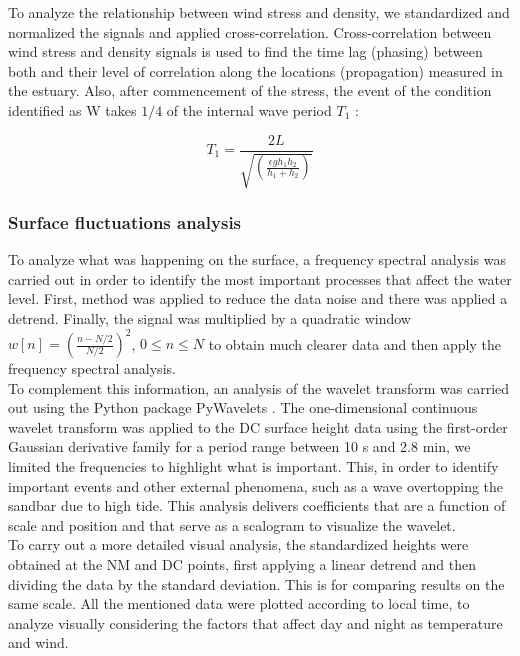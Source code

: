 \documentclass[tesis.tex]{subfiles}
\begin{document}
To analyze the relationship between wind stress and density, we standardized and normalized the signals and applied cross-correlation. Cross-correlation between wind stress and density signals is used to find the time lag (phasing) between both and their level of correlation along the locations (propagation) measured in the estuary. Also, after commencement of the stress, the event of the condition identified as W takes $1/4$ of the internal wave period $T_1$ \citep{stevens1996initial}: 

\begin{equation}
    T_1=\frac{2L}{\sqrt{(\frac{\epsilon g h_1 h_2}{h_1 + h_2})}}
    \label{eq: period}
\end{equation}

\subsubsection{Surface fluctuations analysis}

To analyze what was happening on the surface, a frequency spectral analysis was carried out in order to identify the most important processes that affect the water level. First, \cite{welch1967use} method was applied to reduce the data noise and there was applied a detrend. Finally, the signal was multiplied by a quadratic window $w[n]=\left( \frac{n-N/2}{N/2} \right)^2$, $0 \leq n \leq N$ to obtain much clearer data and then apply the frequency spectral analysis. \\

To complement this information, an analysis of the wavelet transform was carried out using the Python package PyWavelets \citep{lee2019pywavelets}. The one-dimensional continuous wavelet transform was applied to the DC surface height data using the first-order Gaussian derivative family for a period range between 10 s and 2.8 min, we limited the frequencies to highlight what is important. This, in order to identify important events and other external phenomena, such as a wave overtopping the sandbar due to high tide. This analysis delivers coefficients that are a function of scale and position and that serve as a scalogram to visualize the wavelet.\\

To carry out a more detailed visual analysis, the standardized heights were obtained at the NM and DC points, first applying a linear detrend and then dividing the data by the standard deviation. This is for comparing results on the same scale. All the mentioned data were plotted according to local time, to analyze visually considering the factors that affect day and night as temperature and wind.
\end{document}
